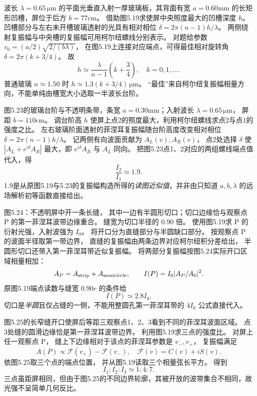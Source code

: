 波长 $\lambda=0.65\,\mathrm{\mu m}$ 的平面光垂直入射一厚玻璃板，其背面有宽
$a=0.60$mm 的长矩形凹槽，屏位于后方
$b=77$cm。
借助图5.19求使屏中央照度最大的凹槽深度 $h$。
\exsolution
凹槽部分与左右未开槽玻璃透射的光具有相对相位
$\delta=2\pi(n-1)h/\lambda$。
两侧绕射复振幅与中央槽的复振幅可用柯尔纽螺线分别表示。
对题给参数
$v_0=(a/2)\sqrt{2/(b\lambda)}$，
在图5.19上连接对应端点，可得最佳相对旋转角
$\delta=2\pi(k+3/4)$。
故
\[
\boxed{h\simeq
\frac{\lambda}{n-1}\left(k+\frac34\right)},
\quad k=0,1,\ldots.
\]
普通玻璃 $n\simeq1.50$ 时
$h\simeq1.3(k+3/4)\,\mathrm{\mu m}$。
\excheck “最佳”来自柯尔纽复振幅相量方向，不能单纯由槽宽大小选取一半波长台阶。

图5.23的玻璃台阶与不透明条带，条宽
$a=0.30$mm；入射波长
$\lambda=0.65\,\mathrm{\mu m}$，
屏距 $b=110$cm。
调台阶高 $h$ 使屏上点2的照度最大，利用柯尔纽螺线求点2与点1的强度之比。
\exsolution
左右玻璃阶面透射的菲涅耳复振幅随台阶高度改变相对相位
$\delta=2\pi(n-1)h/\lambda$。
记两侧有向波面贡献为
$A_L(v),A_R(v)$，
点2处选择 $\delta$ 使
$|A_L+e^{i\delta}A_R|$ 最大，即
$e^{i\delta}A_R$ 与 $A_L$ 同向。
把图5.23点1、2对应的两组螺线端点值代入，得
\[
\boxed{\frac{I_2}{I_1}\simeq1.9}.
\]
\excheck 1.9是从原图5.19与5.23的复振幅构造所得的\emph{读图近似值}，并非由只知道 $a,b,\lambda$ 的远场解析初等函数直接给出。

图5.24：不透明屏中开一条长缝，
其中一边有半圆形切口；切口边缘恰与观察点 P 的第一菲涅耳波带边缘重合。
缝宽为切口半径的 $0.90$ 倍。
使用图5.19求 P 的衍射光强，入射波强为 $I_0$。
\exsolution
将开口分为直缝部分与半圆缺口部分。
按观察点 P 的波面半径取第一带边界，
直缝的复振幅由两条边界对应柯尔纽积分差给出，
半圆形切口还带入第一菲涅耳带近似复振幅。
将两部分复振幅按图5.24实际开口区域相量相加：
\[
A_P=A_{\rm strip}+A_{\rm semicircle},
\qquad I(P)=I_0|A_P/A_0|^2 .
\]
原图5.19端点读数与缝宽 $0.90r$ 的条件给
\[
\boxed{I(P)\simeq2.8I_0}.
\]
\excheck 切口是\emph{半圆}且仅占缝的一侧，不能用整圆孔第一菲涅耳带的 $4I_0$ 公式直接代入。

图5.25的长窄缝开口使屏后等距三观察点1、2、3看到不同的菲涅耳波面区域。
点3处缝的圆滑边缘恰是第一菲涅耳波带边界。
利用图5.19求三点的强度比。
\exsolution
对屏上任一观察点 P，
缝上下边缘相对于该点的菲涅耳参数是
$v_-,v_+$，
复振幅满足
\[
A(P)\propto
\mathcal F(v_+)-\mathcal F(v_-),
\quad \mathcal F(v)=C(v)+iS(v).
\]
依图5.25取三个点的端点位置，
并从图5.19读取三个相量弦长平方。
得到
\[
\boxed{I_1:I_2:I_3\simeq1:4:7}.
\]
\excheck 三点虽距屏相同，但由于图5.25的不同边界轮廓，其被开放的波带集合不相同，故光强不呈简单几何反比。

